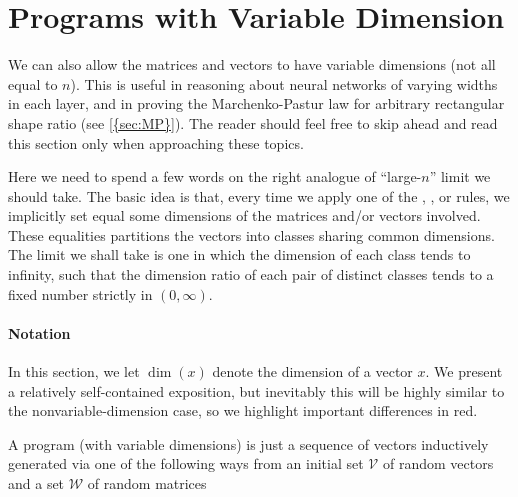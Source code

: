 \documentclass[main.tex]{subfiles}
\begin{document}
\section{Programs with Variable Dimension}
\label{appendix:VarDim}

\newcommand{\highlight}[1]{{\color{red}#1}}

We can also allow the matrices and vectors to have variable dimensions (not all equal to $n$). 
This is useful in reasoning about neural networks of varying widths in each layer, and in proving the Marchenko-Pastur law for arbitrary rectangular shape ratio (see \cref{{sec:MP}}).
The reader should feel free to skip ahead and read this section only when approaching these topics.

Here we need to spend a few words on the right analogue of ``large-$n$'' limit we should take. The basic idea is that, every time we apply one of the , , or  rules, we implicitly set equal some dimensions of the matrices and/or vectors involved. These equalities partitions the vectors into classes sharing common dimensions. The limit we shall take is one in which the dimension of each class tends to infinity, such that the dimension ratio of each pair of distinct classes tends to a fixed number strictly in $(0,\infty)$.

\paragraph*{Notation}

In this section, we let $\dim(x)$ denote the dimension of a vector $x$.
We present a relatively self-contained exposition, but inevitably this will be highly similar to the nonvariable-dimension case, so we highlight important differences in \highlight{red}.
\begin{defn}\label{defn:netsortVarDim}
A \netsort{} program (with variable dimensions) is just a sequence of vectors inductively generated via one of the following ways from an initial set $\mathcal{V}$ of random vectors and a set $\mathcal{W}$ of random matrices 
\end{defn}
\end{document}

